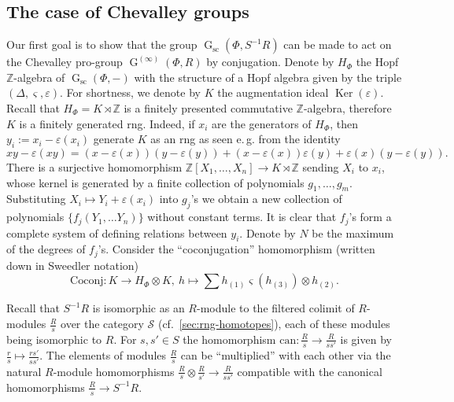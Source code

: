 \documentclass[oneside, 11pt]{amsart}
\numberwithin{equation}{section}
\theoremstyle{definition}
\theoremstyle{remark}
\DeclareMathOperator\Ker{Ker}
\DeclareMathOperator\GG{G}
\newcommand{\ZZ}{\mathbb{Z}}
\begin{document}
\subsection{The case of Chevalley groups} \label{sec:local-Chevalley}
Our first goal is to show that the group \(\GG_{\mathrm{sc}}(\Phi, S^{-1} R)\) can be made to act on the Chevalley pro-group \(\GG^{(\infty)}(\Phi, R)\) by conjugation. Denote by \(H_\Phi\) the Hopf \(\ZZ\)-algebra of \(\GG_{\mathrm{sc}}(\Phi, -)\) with the structure of a Hopf algebra given by the triple $(\Delta, \varsigma, \varepsilon)$. 
For shortness, we denote by $K$ the augmentation ideal $\Ker(\varepsilon)$. Recall that \(H_\Phi= K \rtimes \ZZ\) is a finitely presented commutative \(\ZZ\)-algebra, therefore $K$ is a finitely generated rng. Indeed, if $x_i$ are the generators of $H_\Phi$, then $y_i:=x_i - \varepsilon(x_i)$ generate $K$ as an rng as seen e.\,g. from the identity
$$xy - \varepsilon(xy) = (x - \varepsilon(x)) (y - \varepsilon(y)) + (x - \varepsilon(x)) \varepsilon(y) + \varepsilon(x) (y - \varepsilon(y)).$$
There is a surjective homomorphism $\ZZ[X_1, \ldots, X_n] \to K \rtimes \ZZ$ sending $X_i$ to $x_i$,
whose kernel is generated by a finite collection of polynomials \(g_1, \ldots, g_m\).
Substituting $X_i \mapsto Y_i + \varepsilon(x_i)$ into $g_j$'s we obtain a new collection of polynomials $\{f_j(Y_1,\ldots Y_n)\}$ without constant terms.
It is clear that $f_j$'s form a complete system of defining relations between $y_i$. Denote by \(N\) be the maximum of the degrees of \(f_j\)'s.
Consider the ``coconjugation'' homomorphism (written down in Sweedler notation)
\[\mathrm{Coconj} \colon K \to H_\Phi \otimes K,\ h \mapsto \sum h_{(1)} \varsigma(h_{(3)}) \otimes h_{(2)}.\]

Recall that \(S^{-1} R\) is isomorphic as an $R$-module to the filtered colimit of \(R\)-modules \(\frac Rs\) over the category $\mathcal{S}$ (cf.~\cref{sec:rng-homotopes}), each of these modules being isomorphic to $R$. For $s, s' \in S$ the homomorphism \(\mathrm{can}\colon \frac R{s} \to \frac R{ss'}\) is given by $\tfrac{r}{s} \mapsto \tfrac{rs'}{ss'}$. The elements of modules $\frac Rs$ can be ``multiplied'' with each other via the natural $R$-module homomorphisms $\frac R s \otimes \frac R {s'} \to \frac R {ss'}$ compatible with the canonical homomorphisms $\frac R s \to S^{-1}R$.
\end{document}
